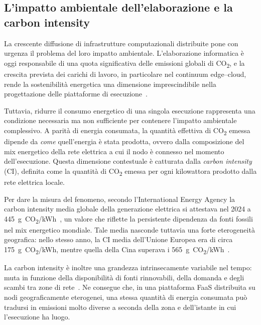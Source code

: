 \subsection{L'impatto ambientale dell'elaborazione e la carbon intensity}
\label{subsec:carbon_intensity}

La crescente diffusione di infrastrutture computazionali distribuite pone con urgenza
il problema del loro impatto ambientale.
L'elaborazione informatica è oggi responsabile di una quota significativa delle emissioni
globali di CO\textsubscript{2}, e la crescita prevista dei carichi di lavoro, in
particolare nel continuum edge--cloud, rende la sostenibilità energetica una
dimensione imprescindibile nella progettazione delle piattaforme di
esecuzione~\cite{Luo2021_EdgeSchedulingSurvey}.

Tuttavia, ridurre il consumo energetico di una singola esecuzione rappresenta una
condizione necessaria ma non sufficiente per contenere l'impatto ambientale
complessivo.
A parità di energia consumata, la quantità effettiva di CO\textsubscript{2} emessa
dipende da \emph{come} quell'energia è stata prodotta, ovvero dalla composizione del
mix energetico della rete elettrica a cui il nodo è connesso nel momento
dell'esecuzione.
Questa dimensione contestuale è catturata dalla \emph{carbon intensity} (CI),
definita come la quantità di CO\textsubscript{2} emessa per ogni kilowattora prodotto
dalla rete elettrica locale.

Per dare la misura del fenomeno, secondo l'International Energy Agency la carbon
intensity media globale della generazione elettrica si attestava nel 2024 a
445~g~CO\textsubscript{2}/kWh~\cite{IEA2025_Electricity}, un valore che riflette
la persistente dipendenza da fonti fossili nel mix energetico mondiale.
Tale media nasconde tuttavia una forte eterogeneità geografica: nello stesso anno,
la CI media dell'Unione Europea era di circa 175~g~CO\textsubscript{2}/kWh, mentre
quella della Cina superava i 565~g~CO\textsubscript{2}/kWh~\cite{IEA2025_Electricity}.

La carbon intensity è inoltre una grandezza intrinsecamente 
variabile nel tempo: muta in funzione della disponibilità 
di fonti rinnovabili, della domanda e degli scambi tra zone di 
rete~\cite{electricitymaps2024}.
 Ne consegue che, in una piattaforma FaaS distribuita su nodi geograficamente eterogenei,
  una stessa quantità di energia consumata può tradursi in emissioni molto diverse 
  a seconda della zona e dell'istante in cui l'esecuzione ha luogo.

